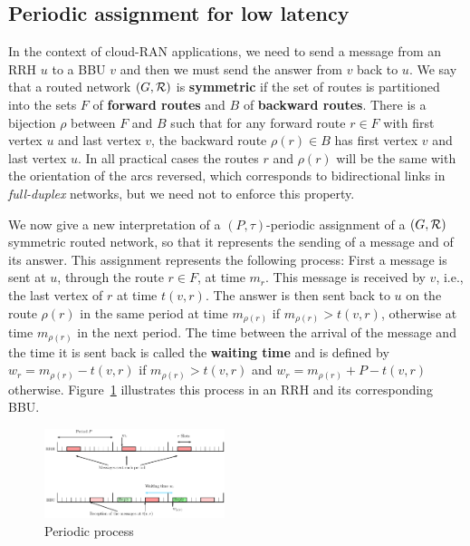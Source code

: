 \documentclass[10pt, conference, letterpaper]{IEEEtran}
\begin{document}
      
      \subsection{Periodic assignment for low latency}
      
   In the context of cloud-RAN applications, we need to send a message from an RRH $u$ to a BBU $v$ and then 
      we must send the answer from $v$ back to $u$. We say that a routed network $(G, {\cal R})$ is \textbf{symmetric} if the set of routes is partitioned into the sets $F$ of \textbf{forward routes} and $B$ of \textbf{backward routes}. There is a bijection $\rho$ between $F$ and $B$ such that for any forward route $r \in F$ with first vertex $u$ and last vertex $v$, the backward route $\rho(r) \in B$ has first vertex $v$ and last vertex $u$. In all practical cases the routes $r$ and $\rho(r)$ will be the same with the orientation of the arcs reversed, which corresponds to bidirectional links in \emph{full-duplex} networks, but we need not to enforce this property.
         
      We now give a new interpretation of a $(P,\tau)$-periodic assignment of a $(G,{\cal R})$ symmetric routed network, so that it represents the sending of a message and of its answer.
      This assignment represents the following process: First a message is sent at $u$, through the route $r \in F$, at time $m_r$.
      This message is received by $v$, i.e., the last vertex of $r$ at time $t(v,r)$. The answer is then sent back to $u$ on the route $\rho(r)$ in the same period at time $m_{\rho(r)}$ if $m_{\rho(r)} > t(v,r)$, otherwise at time $m_{\rho(r)}$ in the next period. The time between the arrival of the message and the time it is sent back is called the \textbf{waiting time} and is defined by $w_r = m_{\rho(r)} - t(v,r)$ if $m_{\rho(r)} > t(v,r)$ and $w_r = m_{\rho(r)} + P - t(v,r)$ otherwise. Figure~\ref{fig:assignment} illustrates this process in an RRH and its corresponding BBU.
 
     \begin{figure}[h]
      \begin{center}
      \includegraphics[width=0.47\textwidth]{rrh.pdf}
      \end{center}
      \caption{Periodic process}\label{fig:assignment}
      \end{figure}
      
\end{document}
